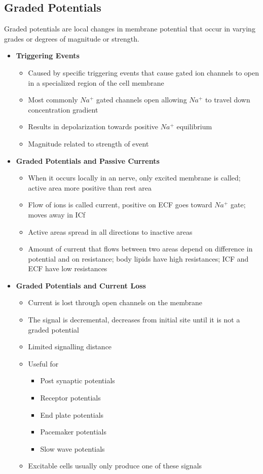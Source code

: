 \documentclass[11pt]{article}
\begin{document}
\subsection{Graded Potentials}
Graded potentials are local changes in membrane potential that occur in varying grades or degrees of magnitude or strength.
\begin{itemize}
\item \textbf{Triggering Events}
\begin{itemize}
\item Caused by specific triggering events that cause gated ion channels to open in a specialized region of the cell membrane
\item Most commonly $Na^+$ gated channels open allowing $Na^+$ to travel down concentration gradient
\item Results in depolarization towards positive $Na^+$ equilibrium
\item Magnitude related to strength of event
\end{itemize}
\item \textbf{Graded Potentials and Passive Currents}
\begin{itemize}
\item When it occurs locally in an nerve, only excited membrane is called; active area more positive than rest area
\item Flow of ions is called current, positive on ECF goes toward $Na^+$ gate; moves away in ICf
\item Active areas spread in all directions to inactive areas
\item Amount of current that flows between two areas depend on difference in potential and on resistance; body lipids have high resistances; ICF and ECF have low resistances
\end{itemize}
\item \textbf{Graded Potentials and Current Loss}
\begin{itemize}
\item Current is lost through open channels on the membrane
\item The signal is decremental, decreases from initial site until it is not a graded potential
\item Limited signalling distance
\item Useful for 
\begin{itemize}
\item Post synaptic potentials
\item Receptor potentials
\item End plate potentials
\item Pacemaker potentials
\item Slow wave potentials
\end{itemize}
\item Excitable cells usually only produce one of these signals
\end{itemize}
\end{itemize}
\end{document}
